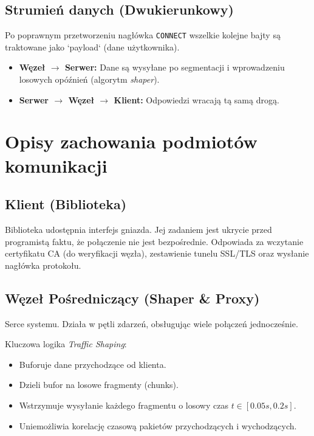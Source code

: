 \documentclass[12pt, a4paper]{article}
\begin{document}
\subsection{Strumień danych (Dwukierunkowy)}
Po poprawnym przetworzeniu nagłówka \texttt{CONNECT} wszelkie kolejne bajty są traktowane jako `payload` (dane użytkownika).
\begin{itemize}
    \item \textbf{Węzeł $\rightarrow$ Serwer:} Dane są wysyłane po segmentacji i wprowadzeniu losowych opóźnień (algorytm \textit{shaper}).
    \item \textbf{Serwer $\rightarrow$ Węzeł $\rightarrow$ Klient:} Odpowiedzi wracają tą samą drogą.
\end{itemize}

\section{Opisy zachowania podmiotów komunikacji}

\subsection{Klient (Biblioteka)}
Biblioteka udostępnia interfejs gniazda. Jej zadaniem jest ukrycie przed programistą faktu, że połączenie nie jest bezpośrednie. Odpowiada za wczytanie certyfikatu CA (do weryfikacji węzła), zestawienie tunelu SSL/TLS oraz wysłanie nagłówka protokołu.

\subsection{Węzeł Pośredniczący (Shaper & Proxy)}
Serce systemu. Działa w pętli zdarzeń, obsługując wiele połączeń jednocześnie.

\begin{minipage}{1.0\linewidth}
    Kluczowa logika \textit{Traffic Shaping}:
    \begin{itemize}
        \item Buforuje dane przychodzące od klienta.
        \item Dzieli bufor na losowe fragmenty (chunks).
        \item Wstrzymuje wysyłanie każdego fragmentu o losowy czas $t \in [0.05s, 0.2s]$.
        \item Uniemożliwia korelację czasową pakietów przychodzących i wychodzących.
    \end{itemize}
\end{minipage}
\end{document}
